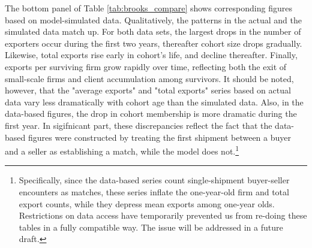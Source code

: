 \documentclass[12pt]{article}
\begin{document}
The bottom panel of Table \ref{tab:brooks_compare} shows corresponding
figures based on model-simulated data. Qualitatively, the patterns in the
actual and the simulated data match up. For both data sets, the largest
drops in the number of exporters occur during the first two years,
thereafter cohort size drops gradually. Likewise, total exports rise early
in cohort's life, and decline thereafter. Finally, exports per surviving
firm grow rapidly over time, reflecting both the exit of small-scale firms
and client accumulation among survivors. It should be noted, however, that
the "average exports" and "total exports" series based on actual data vary
less dramatically with cohort age than the simulated data. Also, in the
data-based figures, the drop in cohort membership is more dramatic during
the first year. In sigifnicant part, these discrepancies reflect the fact
that the data-based figures were constructed by treating the first shipment
between a buyer and a seller as establishing a match, while the model does
not.\footnote{%
Specifically, since the data-based series count single-shipment buyer-seller
encounters as matches, these series inflate the one-year-old firm and total
export counts, while they depress mean exports among one-year olds.
Restrictions on data access have temporarily prevented us from re-doing
these tables in a fully compatible way. The issue will be addressed in a
future draft.}
\end{document}

